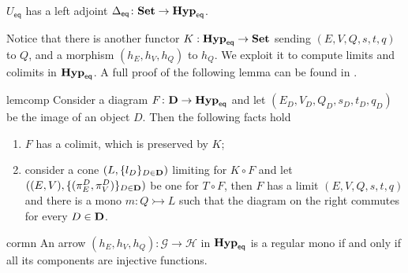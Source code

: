 \documentclass[3p]{elsarticle}
\newcommand{\eq}{\mathsf{eq}}
\newcommand{\Set}{\mathbf{Set}}
\def\D{\textbf {\textup{D}}}
\newcommand{\catname}[1]{\textbf{\textup{#1}}}
\newcommand{\EqHyp}{\catname{Hyp}_{\mathsf{eq}}} %
\newcommand{\mto}{\rightarrowtail}
\theoremstyle{remark}
\theoremstyle{definition}
\begin{document}
\begin{cor}\label{cor:ladj}
	$U_{\eq}$ has a left adjoint $\Delta_{\eq}\colon \Set \to \EqHyp$.
\end{cor}

Notice that there is another functor $K: \EqHyp \to \Set$ sending $(E, V, Q, s, t, q)$ to $Q$, and a morphism $(h_E, h_V, h_Q)$ to $h_Q$. We  exploit it to compute limits and colimits in $\EqHyp$. A full proof of the following lemma can be found in .

\noindent
\begin{minipage}[l]{.83\linewidth}
	\begin{restatable}{lem}{comp}\label{prop:eqhyp_complete}
		Consider a diagram $F\colon \D \to \EqHyp$ and let $(E_D, V_D, Q_D, s_D, t_D, q_D)$ be the image of an object $D$. Then the following facts hold
		\begin{enumerate}
			\item $F$ has a colimit, which is preserved by $K$;
			\item consider a cone $(L, \{l_D\}_{D\in \D})$ limiting  for $K \circ F$ and let $((E, V), \{(\pi^D_E, \pi^D_V)\}_{D\in \D})$ be one for $T\circ F$, then $F$ has a limit $(E, V, Q, s, t, q)$ and there is a mono $m\colon Q\mto L$ such that the diagram on the right commutes for every $D\in \D$.
		\end{enumerate}
	\end{restatable}
\end{minipage}\hfill
\begin{minipage}[r]{.15\linewidth}
\end{minipage} 
  
\begin{restatable}{cor}{mn}\label{cor:mono2}
	An arrow $(h_E, h_V, h_Q): \mathcal{G\to H}$ in $\EqHyp$ is a regular mono if and only if all its components are injective functions.
\end{restatable}
\end{document}
